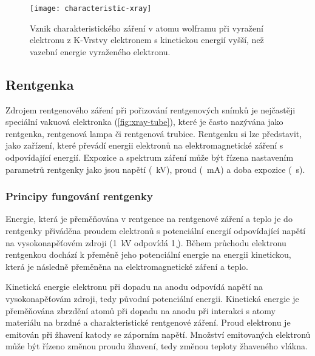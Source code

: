 \begin{figure}[h]
\centering
\texttt{[image: characteristic-xray]}
\caption{Vznik charakteristického záření v atomu wolframu při vyražení elektronu z K-Vrstvy elektronem s kinetickou energií vyšší, než vazební energie vyraženého elektronu. \cite{the-xray-beam}}
\label{fig:characteristic-xray}
\end{figure}

\subsection{Rentgenka}
Zdrojem rentgenového záření při pořizování rentgenových snímků je nejčastěji speciální vakuová elektronka (\cref{fig:xray-tube}), které je často nazývána jako rentgenka, rentgenová lampa či rentgenová trubice. \cite{AstroNuklFyzika-JadRadMetody} Rentgenku si lze představit, jako zařízení, které převádí energii elektronů na elektromagnetické záření s odpovídající energií. Expozice a spektrum záření může být řízena nastavením parametrů rentgenky jako jsou napětí (\SI{}{\kV}), proud (\SI{}{\mA}) a doba expozice (\SI{}{\s}). \cite[str.~93]{Diagnostic-Radiology-Physics}

\subsubsection{Principy fungování rentgenky}
Energie, která je přeměňována v rentgence na rentgenové záření a teplo je do rentgenky přiváděna proudem elektronů s potenciální energií odpovídající napětí na vysokonapěťovém zdroji (\SI{1}{\kV} odpovídá \SI{1}{\k\eV}). 
Během průchodu elektronu rentgenkou dochází k přeměně jeho potenciální energie na energii kinetickou, která je následně přeměněna na elektromagnetické záření a teplo. 

Kinetická energie elektronu při dopadu na anodu odpovídá napětí na vysokonapěťovám zdroji, tedy původní potenciální energii. Kinetická energie je přeměňována zbrzdění atomů při dopadu na anodu  při interakci s atomy materiálu na brzdné a charakteristické rentgenové záření. \cite[kap.~ELECTRON ENERGY]{The-Physical-Principles-of-Medical-Imaging}
Proud elektronu je emitován při žhavení katody se záporním napětí. Množství emitovaných elektronů může být řízeno změnou proudu žhavení, tedy změnou teploty žhaveného vlákna. \cite[str.~93]{Diagnostic-Radiology-Physics} 


